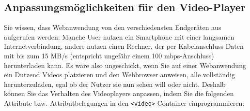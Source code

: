 \subsection{Anpassungsmöglichkeiten für den Video-Player}

Sie wissen, dass Webanwendung von den verschiedensten Endgeräten aus aufgerufen werden: Manche User nutzen ein Smartphone mit einer langsamen Internetverbindung, andere nutzen einen Rechner, der per Kabelanschluss Daten mit bis zum 15 MB/s (entspricht ungefähr einem 100 mbps-Anschluss) herunterladen kann. Es wäre also ungeschickt, wenn Sie auf einer Webanwendung ein Dutzend Videos platzieren und den Webbrowser anweisen, alle vollständig herunterzuladen, egal ob der Nutzer sie nun sehen will oder nicht. Deshalb können Sie das Verhalten des Videoplayers anpassen, indem Sie die folgenden Attribute bzw. Attributbelegungen in den \verb|<video>|-Container einprogrammieren:\\

